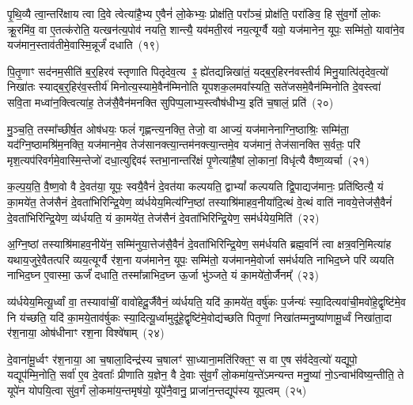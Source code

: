 {\anuvakamend[{जु॒षे॒ सते॑जस॒मन॑क्षसङ्गं बहुशा॒खं वृ॑श्चेदे॒ष वै य॒ज्ञ उपै॑न॒मुत्त॑रो य॒ज्ञ आप्त्या॒ एका॒न्नविꣳ॑श॒तिश्च॑}]}%

पृ॒थि॒व्यै त्वा॒न्तरि॑क्षाय त्वा दि॒वे त्वेत्या॑है॒भ्य ए॒वैनं॑ लो॒केभ्यः॒ प्रोक्ष॑ति॒ परा᳚ञ्चं॒ प्रोक्ष॑ति॒ परा॑ङिव॒ हि सु॑व॒र्गो लो॒कः क्रू॒रमि॑व॒ वा ए॒तत्क॑रोति॒ यत्खन॑त्य॒पोव॑ नयति॒ शान्त्यै॒ यव॑मती॒रव॑ नय॒त्यूर्ग्वै यवो॒ यज॑मानेन॒ यूपः॒ सम्मि॑तो॒ यावा॑ने॒व यज॑मान॒स्ताव॑तीमे॒वास्मि॒न्नूर्जं॑ दधाति~(१९)

पि॒तृ॒णाꣳ सद॑नम॒सीति॑ ब॒र्॒\mbox{}हिरव॑ स्तृणाति पितृदेव॒त्य ꣴ॒ ह्ये॑तद्यन्निखा॑तं॒ यद्ब॒र्॒\mbox{}हिरन॑वस्तीर्य मिनु॒यात्पि॑तृदेव॒त्यो॑ निखा॑तः स्याद्ब॒र्॒\mbox{}हिर॑व॒स्तीर्य॑ मिनोत्य॒स्यामे॒वैन॑म्मिनोति यूपशक॒लमवा᳚स्यति॒ सते॑जसमे॒वैन॑म्मिनोति दे॒वस्त्वा॑ सवि॒ता मध्वा॑न॒क्त्वित्या॑ह॒ तेज॑सै॒वैन॑मनक्ति सुपिप्प॒लाभ्य॒स्त्वौष॑धीभ्य॒ इति॑ च॒षालं॒ प्रति॑~(२०)

मु॒ञ्च॒ति॒ तस्मा᳚च्छीर्\mbox{}ष॒त ओष॑धयः॒ फलं॑ गृह्णन्त्य॒नक्ति॒ तेजो॒ वा आज्यं॒ यज॑मानेनाग्नि॒ष्ठाश्रिः॒ सम्मि॑ता॒ यद॑ग्नि॒ष्ठा\-मश्रि॑म॒नक्ति॒ यज॑मानमे॒व तेज॑सानक्त्या॒न्तम॑नक्त्या॒न्तमे॒व यज॑मानं॒ तेज॑सानक्ति स॒र्वतः॒ परि॑ मृश॒त्यप॑रिवर्गमे॒वा\-स्मि॒न्तेजो॑ दधा॒त्युद्दिवꣴ॑ स्तभा॒नान्तरि॑क्षं पृ॒णेत्या॑है॒षां लो॒कानां॒ विधृ॑त्यै वैष्ण॒व्यर्चा~(२१)

क॒ल्प॒य॒ति॒ वै॒ष्ण॒वो वै दे॒वत॑या॒ यूपः॒ स्वयै॒वैनं॑ दे॒वत॑या कल्पयति॒ द्वा\-भ्यां᳚ कल्पयति द्वि॒पाद्यज॑मानः॒ प्रति॑ष्ठित्यै॒ यं का॒मये॑त॒ तेज॑सैनं दे॒वता॑भिरिन्द्रि॒येण॒ व्य॑र्धयेय॒मित्य॑ग्नि॒ष्ठां तस्याश्रि॑माहव॒नीया॑दि॒त्थं वे॒त्थं वाति॑ नावये॒त्तेज॑सै॒वैनं॑ दे॒वता॑भिरिन्द्रि॒येण॒ व्य॑र्धयति॒ यं का॒मये॑त॒ तेज॑सैनं दे॒वता॑भिरिन्द्रि॒येण॒ सम॑र्धयेय॒मिति॑~(२२)

अ॒ग्नि॒ष्ठां तस्याश्रि॑माहव॒नीये॑न॒ सम्मि॑नुया॒त्तेज॑सै॒वैनं॑ दे॒वता॑भिरिन्द्रि॒येण॒ सम॑र्धयति ब्रह्म॒वनिं॑ त्वा क्षत्र॒वनि॒मित्या॑ह यथाय॒जुरे॒वैतत्परि॑ व्यय॒त्यूर्ग्वै र॑श॒ना यज॑मानेन॒ यूपः॒ सम्मि॑तो॒ यज॑मानमे॒वोर्जा सम॑र्धयति नाभिद॒घ्ने परि॑ व्ययति नाभिद॒घ्न ए॒वास्मा॒ ऊर्जं॑ दधाति॒ तस्मा᳚न्नाभिद॒घ्न ऊ॒र्जा भु॑ञ्जते॒ यं का॒मये॑तो॒र्जैनम्᳚~(२३)

व्य॑र्धयेय॒मित्यू॒र्ध्वां वा॒ तस्यावा॑चीं॒ वावो॑हेदू॒र्जैवैनं॒ व्य॑र्धयति॒ यदि॑ का॒मये॑त॒ वर्\mbox{}षु॑कः प॒र्जन्यः॑ स्या॒दित्यवा॑ची॒मवो॑हे॒\-द्वृष्टि॑मे॒व नि य॑च्छति॒ यदि॑ का॒मये॒ताव॑र्\mbox{}षुकः स्या॒दित्यू॒र्ध्वामुदू॑हे॒द्वृष्टि॑मे॒वोद्य॑च्छति पितृ॒णां निखा॑तम्मनु॒ष्या॑णामू॒र्ध्वं निखा॑ता॒दा र॑श॒नाया॒ ओष॑धीनाꣳ रश॒ना विश्वे॑षाम्~(२४)

दे॒वाना॑मू॒र्ध्वꣳ र॑श॒नाया॒ आ च॒षाला॒दिन्द्र॑स्य च॒षालꣳ॑ सा॒ध्याना॒मति॑रिक्त॒ꣳ॒ स वा ए॒ष स॑र्वदेव॒त्यो॑ यद्यूपो॒ यद्यूप॑\-म्मि॒नोति॒ सर्वा॑ ए॒व दे॒वताः᳚ प्रीणाति य॒ज्ञेन॒ वै दे॒वाः सु॑व॒र्गं लो॒कमा॑य॒न्ते॑\-ऽमन्यन्त मनु॒ष्या॑ नो॒\-ऽन्वाभ॑विष्य॒न्तीति॒ ते यूपे॑न योपयि॒त्वा सु॑व॒र्गं लो॒कमा॑य॒न्तमृष॑यो॒ यूपे॑नै॒वानु॒ प्राजा॑न॒न्तद्यूप॑स्य यूप॒त्वम्~(२५)

